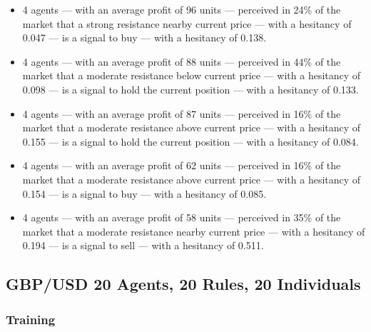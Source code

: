 {\small
  \begin{itemize}
  \item 4 agents — with an average profit of 96 units — perceived in 24\% of the market that a strong resistance nearby current price — with a hesitancy of 0.047 — is a signal to buy — with a hesitancy of 0.138.
  \item 4 agents — with an average profit of 88 units — perceived in 44\% of the market that a moderate resistance below current price — with a hesitancy of 0.098 — is a signal to hold the current position — with a hesitancy of 0.133.
  \item 4 agents — with an average profit of 87 units — perceived in 16\% of the market that a moderate resistance above current price — with a hesitancy of 0.155 — is a signal to hold the current position — with a hesitancy of 0.084.
  \item 4 agents — with an average profit of 62 units — perceived in 16\% of the market that a moderate resistance above current price — with a hesitancy of 0.154 — is a signal to buy — with a hesitancy of 0.085.
  \item 4 agents — with an average profit of 58 units — perceived in 35\% of the market that a moderate resistance nearby current price — with a hesitancy of 0.194 — is a signal to sell — with a hesitancy of 0.511.
  \end{itemize}
}

\subsection{GBP/USD 20 Agents, 20 Rules, 20 Individuals}
\label{}

\subsubsection{Training}
\label{}

